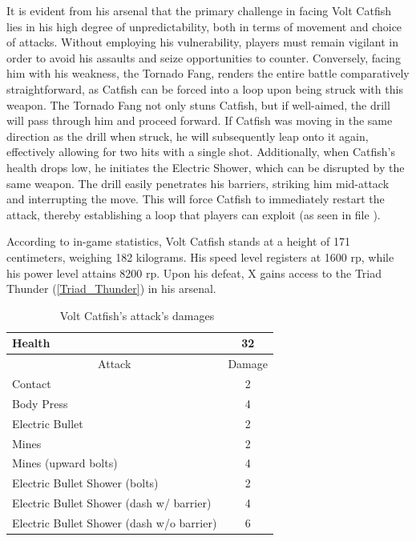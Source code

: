 It is evident from his arsenal that the primary challenge in facing Volt Catfish lies in his high degree of unpredictability, both in terms of movement and choice of attacks. Without employing his vulnerability, players must remain vigilant in order to avoid his assaults and seize opportunities to counter. Conversely, facing him with his weakness, the Tornado Fang, renders the entire battle comparatively straightforward, as Catfish can be forced into a loop upon being struck with this weapon. The Tornado Fang not only stuns Catfish, but if well-aimed, the drill will pass through him and proceed forward. If Catfish was moving in the same direction as the drill when struck, he will subsequently leap onto it again, effectively allowing for two hits with a single shot. Additionally, when Catfish's health drops low, he initiates the Electric Shower, which can be disrupted by the same weapon. The drill easily penetrates his barriers, striking him mid-attack and interrupting the move. This will force Catfish to immediately restart the attack, thereby establishing a loop that players can exploit (as seen in file ).

According to in-game statistics, Volt Catfish stands at a height of 171 centimeters, weighing 182 kilograms. His speed level registers at 1600 rp, while his power level attains 8200 rp. Upon his defeat, X gains access to the Triad Thunder (\ref{Triad_Thunder}) in his arsenal.

\begin{table}[htp]
	\centering
	\begin{tabular}[h]{l c}
		\toprule
		Health  & 32\\
		\midrule
		\multicolumn{1}{c}{Attack} & \multicolumn{1}{c}{Damage}\\
		Contact & 2\\
		Body Press & 4\\
		Electric Bullet& 2\\
		Mines & 2\\
		Mines (upward bolts) & 4\\
		Electric Bullet Shower (bolts)& 2\\
		Electric Bullet Shower (dash w/ barrier)& 4\\
		Electric Bullet Shower (dash w/o barrier)& 6\\
		\bottomrule
	\end{tabular}
	\caption{Volt Catfish's attack's damages~\cite{wiki:Volt_catfish,book:Compendium}}
\end{table} 

